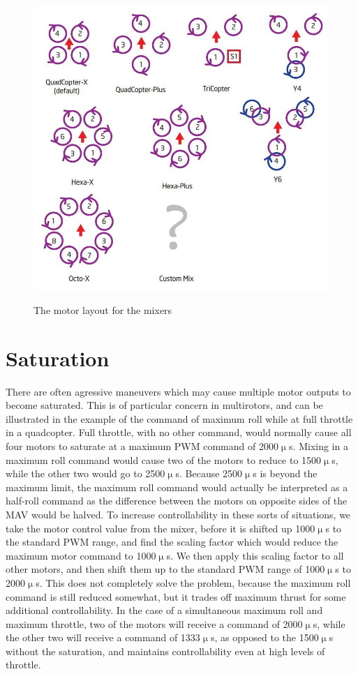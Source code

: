 \documentclass[paper=a4, fontsize=11pt]{scrartcl} %
\begin{document}
\begin{figure}[h]
	\centering
	\includegraphics[scale=0.3]{fig/motor_layout.jpg}
	\label{fig:motor_layout}
	\caption{The motor layout for the mixers}
\end{figure}

\section{Saturation}

There are often agressive maneuvers which may cause multiple motor outputs to become saturated.  This is of particular concern in multirotors, and can be illustrated in the example of the command of maximum roll while at full throttle in a quadcopter.  Full throttle, with no other command, would normally cause all four motors to saturate at a maximum PWM command of 2000$\upmu$s.  Mixing in a maximum roll command would cause two of the motors to reduce to 1500$\upmu$s, while the other two would go to 2500$\upmu$s.  Because 2500$\upmu$s is beyond the maximum limit, the maximum roll command would actually be interpreted as a half-roll command as the difference between the motors on opposite sides of the MAV would be halved.  To increase controllability in these sorts of situations, we take the motor control value from the mixer, before it is shifted up 1000$\upmu$s to the standard PWM range, and find the scaling factor which would reduce the maximum motor command to 1000$\upmu$s.  We then apply this scaling factor to all other motors, and then shift them up to the standard PWM range of 1000$\upmu$s to 2000$\upmu$s.  This does not completely solve the problem, because the maximum roll command is still reduced somewhat, but it trades off maximum thrust for some additional controllability. In the case of a simultaneous maximum roll and maximum throttle, two of the motors will receive a command of 2000$\upmu$s, while the other two will receive a command of 1333$\upmu$s, as opposed to the 1500$\upmu$s without the saturation, and maintains controllability even at high levels of throttle.
\end{document}
